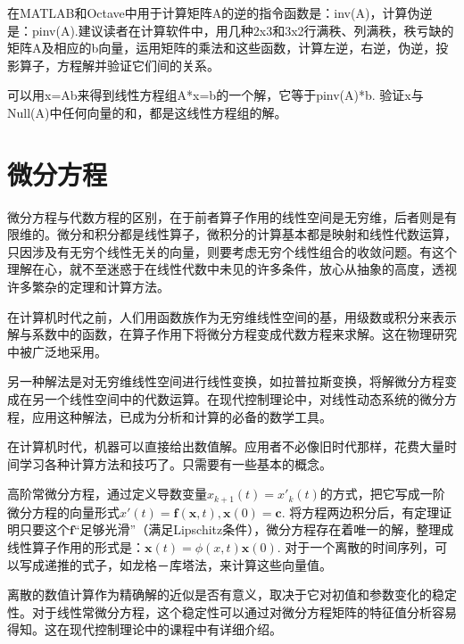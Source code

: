 在MATLAB和Octave中用于计算矩阵A的逆的指令函数是：inv(A)，计算伪逆是：pinv(A).建议读者在计算软件中，用几种2x3和3x2行满秩、列满秩，秩亏缺的矩阵A及相应的b向量，运用矩阵的乘法和这些函数，计算左逆，右逆，伪逆，投影算子，方程解并验证它们间的关系。

可以用x=Ab来得到线性方程组A*x=b的一个解，它等于pinv(A)*b. 验证x与Null(A)中任何向量的和，都是这线性方程组的解。

\songti

\section{微分方程}

微分方程与代数方程的区别，在于前者算子作用的线性空间是无穷维，后者则是有限维的。微分和积分都是线性算子，微积分的计算基本都是映射和线性代数运算，只因涉及有无穷个线性无关的向量，则要考虑无穷个线性组合的收敛问题。有这个理解在心，就不至迷惑于在线性代数中未见的许多条件，放心从抽象的高度，透视许多繁杂的定理和计算方法。

在计算机时代之前，人们用函数族作为无穷维线性空间的基，用级数或积分来表示解与系数中的函数，在算子作用下将微分方程变成代数方程来求解。这在物理研究中被广泛地采用。

另一种解法是对无穷维线性空间进行线性变换，如拉普拉斯变换，将解微分方程变成在另一个线性空间中的代数运算。在现代控制理论中，对线性动态系统的微分方程，应用这种解法，已成为分析和计算的必备的数学工具。

在计算机时代，机器可以直接给出数值解。应用者不必像旧时代那样，花费大量时间学习各种计算方法和技巧了。只需要有一些基本的概念。

高阶常微分方程，通过定义导数变量$ x_{k+1}(t)=x'_k(t) $的方式，把它写成一阶微分方程的向量形式$ x'(t) = \mathbf{f}(\mathbf{x}, t), \mathbf{x}(0) = \mathbf{c} $. 将方程两边积分后，有定理证明只要这个$ \mathbf{f} $``足够光滑''（满足Lipschitz条件），微分方程存在着唯一的解，整理成线性算子作用的形式是：$ \mathbf{x}(t) =\phi(x,t)\mathbf{x}(0) $. 对于一个离散的时间序列，可以写成递推的式子，如龙格－库塔法，来计算这些向量值。

离散的数值计算作为精确解的近似是否有意义，取决于它对初值和参数变化的稳定性。对于线性常微分方程，这个稳定性可以通过对微分方程矩阵的特征值分析容易得知。这在现代控制理论中的课程中有详细介绍。